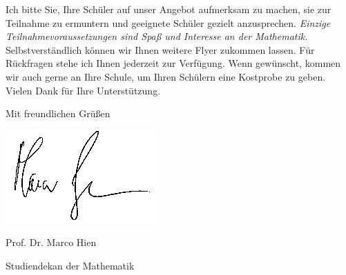 \documentclass{zirkelbrief}
\begin{document}
Ich bitte Sie, Ihre Schüler auf unser Angebot aufmerksam zu machen, sie zur
Teilnahme zu ermuntern und geeignete Schüler gezielt
anzusprechen. \emph{Einzige Teilnahmevoraussetzungen sind Spaß und
Interesse an der Mathematik.} Selbstverständlich können wir Ihnen weitere Flyer
zukommen lassen. Für Rückfragen stehe ich Ihnen jederzeit zur Verfügung. Wenn gewünscht, kommen wir auch
gerne an Ihre Schule, um Ihren Schülern eine Kostprobe zu geben. Vielen Dank für Ihre
Unterstützung.

Mit freundlichen Grüßen
\vspace{0.0cm}

\hspace{1cm} \includegraphics[scale=0.4]{unterschrift_marco_hien}

\vspace{-0.4cm}

Prof. Dr. Marco Hien

\vspace{-0.2cm}

{\small Studiendekan der Mathematik}
\end{document}
